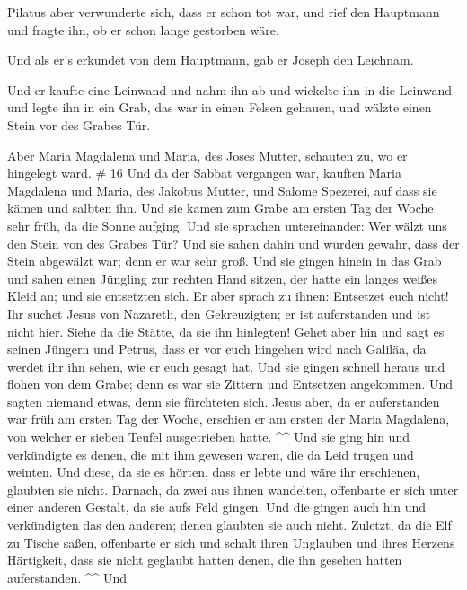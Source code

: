  Pilatus aber verwunderte sich, dass er schon tot war,
und rief den Hauptmann und fragte ihn, ob er schon lange gestorben wäre.

 Und als er's erkundet von dem Hauptmann, gab er Joseph
den Leichnam.

 Und er kaufte eine Leinwand und nahm ihn ab und wickelte
ihn in die Leinwand und legte ihn in ein Grab, das war in einen Felsen
gehauen, und wälzte einen Stein vor des Grabes Tür.

 Aber Maria Magdalena und Maria, des Joses Mutter,
schauten zu, wo er hingelegt ward. \# 16  Und da der
Sabbat vergangen war, kauften Maria Magdalena und Maria, des Jakobus
Mutter, und Salome Spezerei, auf dass sie kämen und salbten ihn.
 Und sie kamen zum Grabe am ersten Tag der Woche sehr
früh, da die Sonne aufging.  Und sie sprachen
untereinander: Wer wälzt uns den Stein von des Grabes Tür?
 Und sie sahen dahin und wurden gewahr, dass der Stein
abgewälzt war; denn er war sehr groß.  Und sie gingen
hinein in das Grab und sahen einen Jüngling zur rechten Hand sitzen, der
hatte ein langes weißes Kleid an; und sie entsetzten sich.
 Er aber sprach zu ihnen: Entsetzet euch nicht! Ihr suchet
Jesus von Nazareth, den Gekreuzigten; er ist auferstanden und ist nicht
hier. Siehe da die Stätte, da sie ihn hinlegten!  Gehet
aber hin und sagt es seinen Jüngern und Petrus, dass er vor euch
hingehen wird nach Galiläa, da werdet ihr ihn sehen, wie er euch gesagt
hat.  Und sie gingen schnell heraus und flohen von dem
Grabe; denn es war sie Zittern und Entsetzen angekommen. Und sagten
niemand etwas, denn sie fürchteten sich.  Jesus aber, da
er auferstanden war früh am ersten Tag der Woche, erschien er am ersten
der Maria Magdalena, von welcher er sieben Teufel ausgetrieben hatte.
\^{}\^{}  Und sie ging hin und verkündigte es denen, die
mit ihm gewesen waren, die da Leid trugen und weinten. 
Und diese, da sie es hörten, dass er lebte und wäre ihr erschienen,
glaubten sie nicht.  Darnach, da zwei aus ihnen
wandelten, offenbarte er sich unter einer anderen Gestalt, da sie aufs
Feld gingen.  Und die gingen auch hin und verkündigten
das den anderen; denen glaubten sie auch nicht.  Zuletzt,
da die Elf zu Tische saßen, offenbarte er sich und schalt ihren
Unglauben und ihres Herzens Härtigkeit, dass sie nicht geglaubt hatten
denen, die ihn gesehen hatten auferstanden. \^{}\^{}  Und
